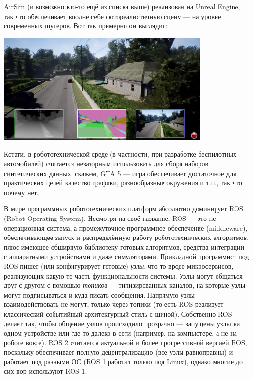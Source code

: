 \documentclass{../../text-style}
\begin{document}
AirSim (и возможно кто-то ещё из списка выше) реализован на Unreal Engine, так что обеспечивает вполне себе фотореалистичную сцену --- на уровне современных шутеров. Вот так примерно он выглядит:

\begin{center}
    \includegraphics[width=0.8\textwidth]{airSim.png}
\end{center}

Кстати, в робототехнической среде (в частности, при разработке беспилотных автомобилей) считается незазорным использовать для сбора наборов синтетических данных, скажем, GTA 5 --- игра обеспечивает достаточное для практических целей качество графики, разнообразные окружения и т.п., так что почему нет. 

В мире программных робототехнических платформ абсолютно доминирует ROS (Robot Operating System).
Несмотря на своё название, ROS --- это не операционная система, а промежуточное программное обеспечение (middleware), обеспечивающее запуск и распределённую работу робототехнических алгоритмов, плюс имеющее обширную библиотеку готовых алгоритмов, средства интеграции с аппаратными устройствами и даже симуляторами.
Прикладной программист под ROS пишет (или конфигурирует готовые) \emph{узлы}, что-то вроде микросервисов, реализующих какую-то часть функциональности системы. 
Узлы могут общаться друг с другом с помощью \emph{топиков} --- типизированных каналов, на которые узлы могут подписываться и куда писать сообщения.
Напрямую узлы взаимодействовать не могут, только через топики (то есть ROS реализует классический событийный архитектурный стиль с шиной).
Собственно ROS делает так, чтобы общение узлов происходило прозрачно --- запущены узлы на одном устройстве или где-то далеко в сети (например, на компьютере, а не на роботе вовсе).
ROS 2 считается актуальной и более прогрессивной версией ROS, поскольку обеспечивает полную децентрализацию (все узлы равноправны) и работает под разными ОС (ROS 1 работал только под Linux), однако многие до сих пор используют ROS 1.
\end{document}
